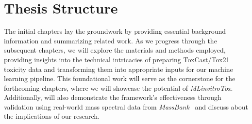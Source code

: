 \section{Thesis Structure}

The initial chapters lay the groundwork by providing essential background information and summarizing related work. As we progress through the subsequent chapters, we will explore the materials and methods employed, providing insights into the technical intricacies of preparing ToxCast/Tox21 toxicity data and transforming them into appropriate inputs for our machine learning pipeline. This foundational work will serve as the cornerstone for the forthcoming chapters, where we will showcase the potential of \emph{MLinvitroTox}. Additionally, will also demonstrate the framework's effectiveness through validation using real-world mass spectral data from \emph{MassBank}~\cite{massbank} and discuss about the implications of our research.
